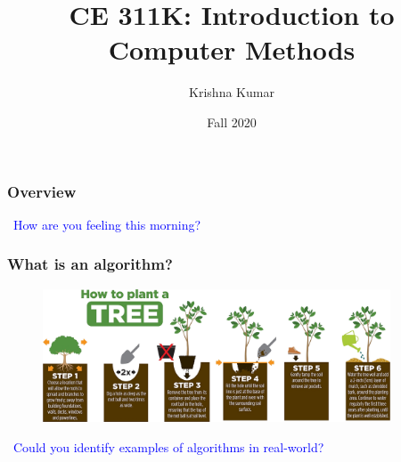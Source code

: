 \documentclass[notes]{beamer}
\title[CE 311K: Intro to Computer Methods]{CE 311K: Introduction to Computer Methods}
\author{Krishna Kumar} %
\institute[UT Austin] %
{
University of Texas at Austin \\
\medskip
\href{mailto:krishnak@utexas.edu}{krishnak@utexas.edu} %
}
\date{Fall 2020} %
\begin{document}
\begin{frame}
\titlepage %
\end{frame}



\begin{frame}
 \frametitle{Overview}
 \tableofcontents
 \textcolor{blue}{\faQuestionCircleO ~How are you feeling this morning?}
\end{frame}

\newif\ifshowtoc
\showtoctrue%

\AtBeginSection{%
	\ifshowtoc
	\begin{frame}
		\tableofcontents[currentsection, subsectionstyle=show/show/hide]
	\end{frame}
	\fi
}

\begin{frame}
	\frametitle{What is an algorithm?}
	\begin{figure}[ht]
		\centering
		\includegraphics[width=0.92\textwidth]{figs/plant-tree.png}
	\end{figure}
	\textcolor{blue}{\faQuestionCircleO ~Could you identify examples of algorithms in real-world?}
\end{frame}
\end{document}
